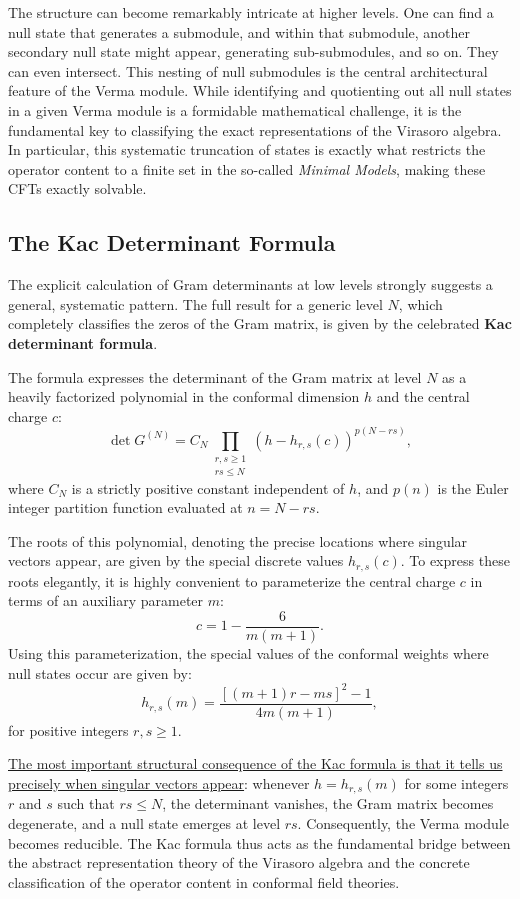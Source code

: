 The structure can become remarkably intricate at higher levels. One can find a null state that generates a submodule, and within that submodule, another secondary null state might appear, generating sub-submodules, and so on. They can even intersect. This nesting of null submodules is the central architectural feature of the Verma module. While identifying and quotienting out all null states in a given Verma module is a formidable mathematical challenge, it is the fundamental key to classifying the exact representations of the Virasoro algebra. In particular, this systematic truncation of states is exactly what restricts the operator content to a finite set in the so-called \textit{Minimal Models}, making these CFTs exactly solvable.

\subsection{The Kac Determinant Formula}

The explicit calculation of Gram determinants at low levels strongly suggests a general, systematic pattern. The full result for a generic level $N$, which completely classifies the zeros of the Gram matrix, is given by the celebrated \textbf{Kac determinant formula}.

The formula expresses the determinant of the Gram matrix at level $N$ as a heavily factorized polynomial in the conformal dimension $h$ and the central charge $c$:
\[
    \det G^{(N)} = C_N \prod_{\substack{r,s \geq 1 \\ rs \leq N}} \left( h - h_{r,s}(c) \right)^{p(N-rs)},
\]
where $C_N$ is a strictly positive constant independent of $h$, and $p(n)$ is the Euler integer partition function evaluated at $n = N-rs$.

The roots of this polynomial, denoting the precise locations where singular vectors appear, are given by the special discrete values $h_{r,s}(c)$. To express these roots elegantly, it is highly convenient to parameterize the central charge $c$ in terms of an auxiliary parameter $m$:
\[
    c = 1 - \frac{6}{m(m+1)}.
\]
Using this parameterization, the special values of the conformal weights where null states occur are given by:
\[
    h_{r,s}(m) = \frac{[(m+1)r - ms]^2 - 1}{4m(m+1)},
\]
for positive integers $r, s \ge 1$.

\uline{The most important structural consequence of the Kac formula is that it tells us precisely when singular vectors appear}: whenever $h = h_{r,s}(m)$ for some integers $r$ and $s$ such that $rs \le N$, the determinant vanishes, the Gram matrix becomes degenerate, and a null state emerges at level $rs$. Consequently, the Verma module becomes reducible. The Kac formula thus acts as the fundamental bridge between the abstract representation theory of the Virasoro algebra and the concrete classification of the operator content in conformal field theories.


